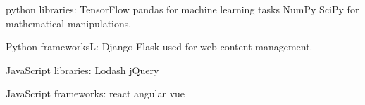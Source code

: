 
python libraries:
  TensorFlow
  pandas
  for machine learning tasks
  NumPy
  SciPy
  for mathematical manipulations.


Python frameworksL:
  Django
  Flask
  used for web content management.

JavaScript libraries:
  Lodash
  jQuery

JavaScript frameworks:
  react
  angular
  vue
